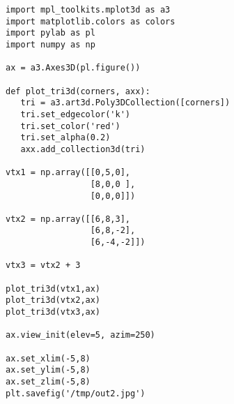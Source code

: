 

\begin{verbatim}
import mpl_toolkits.mplot3d as a3
import matplotlib.colors as colors
import pylab as pl
import numpy as np

ax = a3.Axes3D(pl.figure())

def plot_tri3d(corners, axx):
   tri = a3.art3d.Poly3DCollection([corners])
   tri.set_edgecolor('k')
   tri.set_color('red')
   tri.set_alpha(0.2)
   axx.add_collection3d(tri)

vtx1 = np.array([[0,5,0],
                 [8,0,0 ],
                 [0,0,0]])

vtx2 = np.array([[6,8,3],
                 [6,8,-2],
                 [6,-4,-2]])

vtx3 = vtx2 + 3

plot_tri3d(vtx1,ax)
plot_tri3d(vtx2,ax)
plot_tri3d(vtx3,ax)

ax.view_init(elev=5, azim=250)

ax.set_xlim(-5,8)
ax.set_ylim(-5,8)
ax.set_zlim(-5,8)
plt.savefig('/tmp/out2.jpg')
\end{verbatim}


